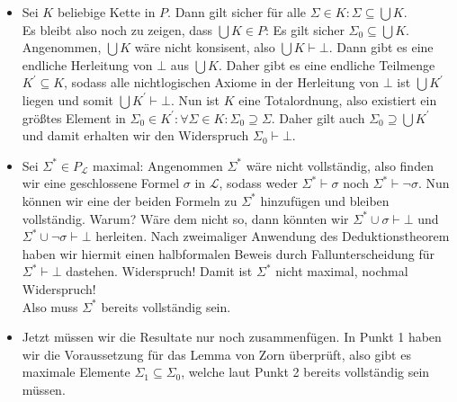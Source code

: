 \begin{solution}
\phantom{}
\begin{itemize}
  \item Sei $K$ beliebige Kette in $P$. Dann gilt sicher für alle
  $\Sigma \in K: \Sigma \subseteq \bigcup K$. \\
  Es bleibt also noch zu zeigen, dass $\bigcup K \in P$:
  Es gilt sicher $\Sigma_0 \subseteq \bigcup K$. \\
  Angenommen, $\bigcup K$
  wäre nicht konsisent, also $\bigcup K \vdash \bot$. Dann gibt es eine endliche
  Herleitung von $\bot$ aus $\bigcup K$. Daher gibt es eine endliche Teilmenge $K^{\prime} \subseteq K$,
  sodass alle nichtlogischen Axiome in der Herleitung von $\bot$ ist $\bigcup K^{\prime}$ liegen
  und somit $\bigcup K^{\prime} \vdash \bot$. Nun ist $K$ eine Totalordnung, also
  existiert ein größtes Element in
  $\Sigma_0 \in K^{\prime}: \forall \Sigma \in K: \Sigma_0 \supseteq \Sigma$.
  Daher gilt auch $\Sigma_0 \supseteq \bigcup K^{\prime}$ und damit erhalten wir
  den Widerspruch $\Sigma_0 \vdash \bot$.
  \item Sei $\Sigma^* \in P_{\mathscr{L}}$ maximal: Angenommen $\Sigma^*$ wäre nicht vollständig,
  also finden wir eine geschlossene Formel $\sigma$ in $\mathscr{L}$, sodass weder
  $\Sigma^* \vdash \sigma$ noch $\Sigma^* \vdash \neg \sigma$. Nun können wir eine
  der beiden Formeln zu $\Sigma^*$ hinzufügen und bleiben vollständig. Warum?
  Wäre dem nicht so, dann könnten wir $\Sigma^* \cup \sigma \vdash \bot$
  und $\Sigma^* \cup \neg \sigma \vdash \bot$ herleiten. Nach zweimaliger
  Anwendung des Deduktionstheorem haben wir hiermit einen halbformalen Beweis
  durch Fallunterscheidung für $\Sigma^* \vdash \bot$ dastehen. Widerspruch!
  Damit ist $\Sigma^*$ nicht maximal, nochmal Widerspruch! \\
  Also muss $\Sigma^*$ bereits vollständig sein.
  \item Jetzt müssen wir die Resultate nur noch zusammenfügen. In Punkt 1
  haben wir die Voraussetzung für das Lemma von Zorn überprüft, also
  gibt es maximale Elemente $\Sigma_1 \subseteq \Sigma_0$, welche laut Punkt 2
  bereits vollständig sein müssen.

\end{itemize}

\end{solution}

